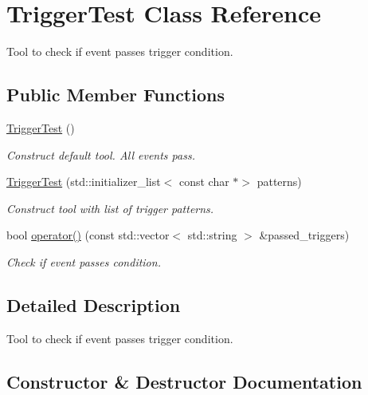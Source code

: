 \hypertarget{classTriggerTest}{}\section{Trigger\+Test Class Reference}
\label{classTriggerTest}


Tool to check if event passes trigger condition.  


\subsection*{Public Member Functions}
\begin{DoxyCompactItemize}
\item 
\mbox{\label{classTriggerTest_a3bbbe4695c639013df0c8891b72e6d69}} 
\mbox{\hyperlink{classTriggerTest_a3bbbe4695c639013df0c8891b72e6d69}{Trigger\+Test}} ()
\begin{DoxyCompactList}\small\item\em Construct default tool. All events pass. \end{DoxyCompactList}\item 
\mbox{\hyperlink{classTriggerTest_a2c28f49164768f1694381b9ccbd076c4}{Trigger\+Test}} (std\+::initializer\+\_\+list$<$ const char $\ast$$>$ patterns)
\begin{DoxyCompactList}\small\item\em Construct tool with list of trigger patterns. \end{DoxyCompactList}\item 
bool \mbox{\hyperlink{classTriggerTest_ab05af0ca18b7b4d0ae0156ee26891d3e}{operator()}} (const std\+::vector$<$ std\+::string $>$ \&passed\+\_\+triggers)
\begin{DoxyCompactList}\small\item\em Check if event passes condition. \end{DoxyCompactList}\end{DoxyCompactItemize}


\subsection{Detailed Description}
Tool to check if event passes trigger condition. 

\subsection{Constructor \& Destructor Documentation}
\mbox{\label{classTriggerTest_a2c28f49164768f1694381b9ccbd076c4}} 
